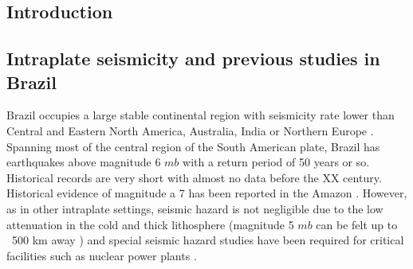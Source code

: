 \documentclass[draft, grl]{agutex}
\begin{document}

\begin{article}

\section{Introduction}

\subsection{Intraplate seismicity and previous studies in Brazil}

Brazil occupies a large stable continental region with seismicity rate lower than Central and Eastern North America, Australia, India or Northern Europe \citep{giardini_1999,johnston_1996a}. Spanning most of the central region of the South American plate, Brazil has earthquakes above magnitude 6 $mb$ with a return period of 50 years or so. Historical records are very short with almost no data before the XX century. Historical evidence of magnitude a 7 has been reported in the Amazon \citep{berrocal_1984,veloso_2014}. However, as in other intraplate settings, seismic hazard is not negligible due to the low attenuation in the cold and thick lithosphere (magnitude 5 $mb$ can be felt up to ~500 km away \citep{assumpcao_et_al_2014}) and special seismic hazard studies have been required for critical facilities such as nuclear power plants \citep{almeida_etal_2013}.


\end{article}
\end{document}
